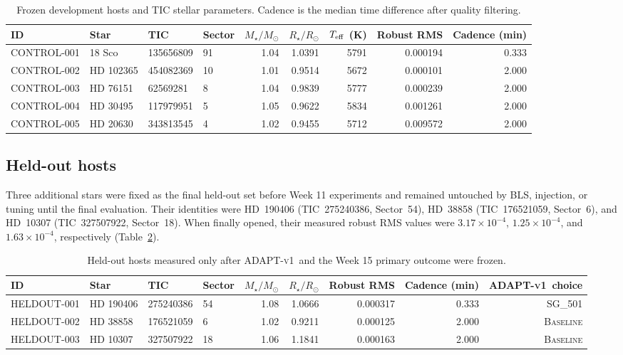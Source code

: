 \documentclass[11pt]{article}
\newcommand{\adapt}{\textsc{ADAPT-v1}}
\newcommand{\sg}[1]{\textsc{SG\_#1}}
\newcommand{\baseline}{\textsc{Baseline}}
\begin{document}
\begin{table}[htbp]
\centering
\caption{Frozen development hosts and TIC stellar parameters. Cadence is the median time difference after quality filtering.}
\label{tab:devhosts}
\small
\begin{tabular}{llllrrrrr}
\toprule
ID & Star & TIC & Sector & $M_\star/M_\odot$ & $R_\star/R_\odot$ & $T_{\rm eff}$ (K) & Robust RMS & Cadence (min)\\
\midrule
CONTROL-001 & 18 Sco    & 135656809 & 91 & 1.04 & 1.0391 & 5791 & 0.000194 & 0.333\\
CONTROL-002 & HD 102365 & 454082369 & 10 & 1.01 & 0.9514 & 5672 & 0.000101 & 2.000\\
CONTROL-003 & HD 76151  &  62569281 &  8 & 1.04 & 0.9839 & 5777 & 0.000239 & 2.000\\
CONTROL-004 & HD 30495  & 117979951 &  5 & 1.05 & 0.9622 & 5834 & 0.001261 & 2.000\\
CONTROL-005 & HD 20630  & 343813545 &  4 & 1.02 & 0.9455 & 5712 & 0.009572 & 2.000\\
\bottomrule
\end{tabular}
\end{table}

\subsection{Held-out hosts}
Three additional stars were fixed as the final held-out set before Week 11 experiments and remained untouched by BLS, injection, or tuning until the final evaluation. Their identities were HD~190406 (TIC~275240386, Sector~54), HD~38858 (TIC~176521059, Sector~6), and HD~10307 (TIC~327507922, Sector~18). When finally opened, their measured robust RMS values were $3.17\times10^{-4}$, $1.25\times10^{-4}$, and $1.63\times10^{-4}$, respectively (Table~\ref{tab:heldout}).

\begin{table}[htbp]
\centering
\caption{Held-out hosts measured only after \adapt\ and the Week 15 primary outcome were frozen.}
\label{tab:heldout}
\small
\begin{tabular}{llllrrrrr}
\toprule
ID & Star & TIC & Sector & $M_\star/M_\odot$ & $R_\star/R_\odot$ & Robust RMS & Cadence (min) & \adapt\ choice\\
\midrule
HELDOUT-001 & HD 190406 & 275240386 & 54 & 1.08 & 1.0666 & 0.000317 & 0.333 & \sg{501}\\
HELDOUT-002 & HD 38858  & 176521059 &  6 & 1.02 & 0.9211 & 0.000125 & 2.000 & \baseline\\
HELDOUT-003 & HD 10307  & 327507922 & 18 & 1.06 & 1.1841 & 0.000163 & 2.000 & \baseline\\
\bottomrule
\end{tabular}
\end{table}
\end{document}
